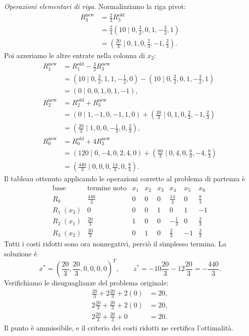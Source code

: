 \emph{Operazioni elementari di riga.} Normalizziamo la riga pivot:
\[
\begin{aligned}
R_3^{\mathrm{new}}&=\frac{2}{3}R_3^{\mathrm{old}}\\
&=\frac23\left(10\mid0,\frac32,0,1,-\frac32,1\right)\\
&=\left(\frac{20}{3}\mid0,1,0,\frac23,-1,\frac23\right).
\end{aligned}
\]
Poi azzeriamo le altre entrate nella colonna di $x_2$:
\[
\begin{aligned}
R_1^{\mathrm{new}}&=R_1^{\mathrm{old}}-\frac32R_3^{\mathrm{new}}\\
&=\left(10\mid0,\frac32,1,1,-\frac12,0\right)
-\left(10\mid0,\frac32,0,1,-\frac32,1\right)\\
&=\left(0\mid0,0,1,0,1,-1\right),\\[3pt]
R_2^{\mathrm{new}}&=R_2^{\mathrm{old}}+R_3^{\mathrm{new}}\\
&=\left(0\mid1,-1,0,-1,1,0\right)
+\left(\frac{20}{3}\mid0,1,0,\frac23,-1,\frac23\right)\\
&=\left(\frac{20}{3}\mid1,0,0,-\frac13,0,\frac23\right),\\[3pt]
R_0^{\mathrm{new}}&=R_0^{\mathrm{old}}+4R_3^{\mathrm{new}}\\
&=\left(120\mid0,-4,0,2,4,0\right)
+\left(\frac{80}{3}\mid0,4,0,\frac83,-4,\frac83\right)\\
&=\left(\frac{440}{3}\mid0,0,0,\frac{14}{3},0,\frac83\right).
\end{aligned}
\]
Il tableau ottenuto applicando le operazioni corrette al problema di partenza è
\[
\begin{array}{c|r|rrrrrr}
\text{base}&\text{termine noto}&x_1&x_2&x_3&x_4&x_5&x_6\\\hline
R_0&\frac{440}{3}&0&0&0&\frac{14}{3}&0&\frac83\\\hline
R_1\;(x_3)&0&0&0&1&0&1&-1\\
R_2\;(x_1)&\frac{20}{3}&1&0&0&-\frac13&0&\frac23\\
R_3\;(x_2)&\frac{20}{3}&0&1&0&\frac23&-1&\frac23
\end{array}
\]
Tutti i costi ridotti sono ora nonnegativi, perciò il simplesso termina. La soluzione è
\[
x^*=\left(\frac{20}{3},\frac{20}{3},0,0,0,0\right)^T,
\qquad z^*=-10\frac{20}{3}-12\frac{20}{3}=-\frac{440}{3}.
\]
Verifichiamo le disuguaglianze del problema originale:
\[
\begin{aligned}
\frac{20}{3}+2\frac{20}{3}+2(0)&=20,\\
2\frac{20}{3}+\frac{20}{3}+2(0)&=20,\\
2\frac{20}{3}+\frac{20}{3}+0&=20.
\end{aligned}
\]
Il punto è ammissibile, e il criterio dei costi ridotti ne certifica l'ottimalità.

